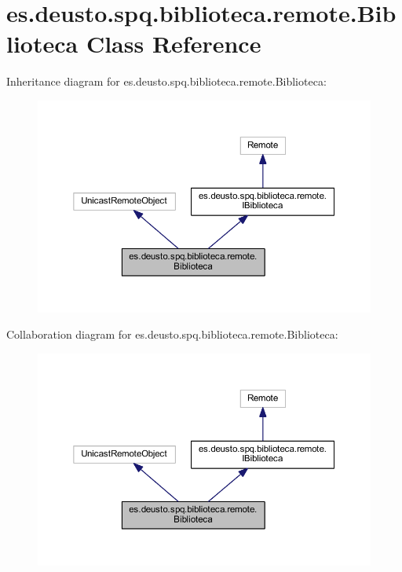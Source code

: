 \hypertarget{classes_1_1deusto_1_1spq_1_1biblioteca_1_1remote_1_1_biblioteca}{}\section{es.\+deusto.\+spq.\+biblioteca.\+remote.\+Biblioteca Class Reference}
\label{classes_1_1deusto_1_1spq_1_1biblioteca_1_1remote_1_1_biblioteca}


Inheritance diagram for es.\+deusto.\+spq.\+biblioteca.\+remote.\+Biblioteca\+:
\nopagebreak
\begin{figure}[H]
\begin{center}
\leavevmode
\includegraphics[width=350pt]{classes_1_1deusto_1_1spq_1_1biblioteca_1_1remote_1_1_biblioteca__inherit__graph}
\end{center}
\end{figure}


Collaboration diagram for es.\+deusto.\+spq.\+biblioteca.\+remote.\+Biblioteca\+:
\nopagebreak
\begin{figure}[H]
\begin{center}
\leavevmode
\includegraphics[width=350pt]{classes_1_1deusto_1_1spq_1_1biblioteca_1_1remote_1_1_biblioteca__coll__graph}
\end{center}
\end{figure}
